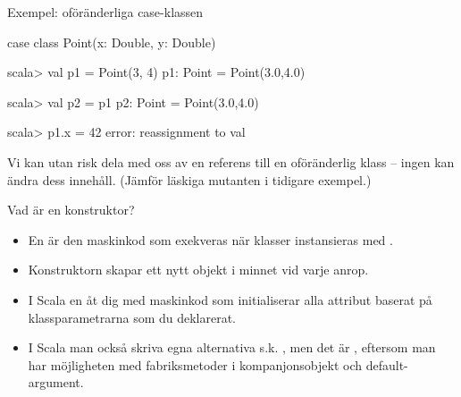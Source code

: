 \begin{Slide}{Exempel: oföränderliga case-klassen }

\begin{Code}[basicstyle=\SlideFontSize{10}{12}\ttfamily]
case class Point(x: Double, y: Double)
\end{Code}

\begin{REPLnonum}
scala> val p1 = Point(3, 4)
p1: Point = Point(3.0,4.0)

scala> val p2 = p1
p2: Point = Point(3.0,4.0)

scala> p1.x = 42
error: reassignment to val
\end{REPLnonum}
Vi kan utan risk dela med oss av en referens till en oföränderlig klass -- ingen kan ändra dess innehåll. (Jämför läskiga mutanten i tidigare exempel.)

\end{Slide}









\begin{Slide}{Vad är en konstruktor?}
\begin{itemize}
\item En  är den maskinkod som exekveras när klasser instansieras med .

\item Konstruktorn skapar ett nytt objekt i minnet vid varje anrop.

\item I Scala  en  åt dig med maskinkod som initialiserar alla attribut baserat på klassparametrarna som du deklarerat.

\pause


\item I Scala  man också skriva egna alternativa s.k. , men det är , eftersom man har möjligheten med fabriksmetoder i kompanjonsobjekt och default-argument.
\end{itemize}
\end{Slide}


